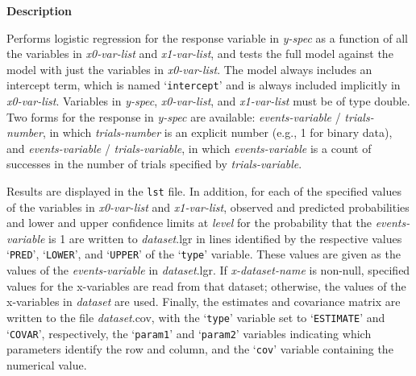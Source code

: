 \documentclass{book}
\newcommand\Texinfocommandstyletextvar[1]{{\normalfont{}\textsl{#1}}}%
\renewcommand{\_}{\Texinfounderscore\discretionary{}{}{}}
\begin{document}
%
%
%

\noindent{}\textbf{Description}

Performs logistic regression for the response variable in
\Texinfocommandstyletextvar{y-spec} as a function of all the variables in
\Texinfocommandstyletextvar{x0-var-list} and \Texinfocommandstyletextvar{x1-var-list},
and tests the full model against the model with just the variables in
\Texinfocommandstyletextvar{x0-var-list}.
The model always includes an intercept term, which is named
`\texttt{\_intercept\_}' and is always included implicitly in
\Texinfocommandstyletextvar{x0-var-list}.
Variables in \Texinfocommandstyletextvar{y-spec}, \Texinfocommandstyletextvar{x0-var-list}, and \Texinfocommandstyletextvar{x1-var-list}
must be of type double.
Two forms for the response in \Texinfocommandstyletextvar{y-spec}
are available: \Texinfocommandstyletextvar{events-variable} / \Texinfocommandstyletextvar{trials-number},
in which \Texinfocommandstyletextvar{trials-number} is an explicit number (e.g., 1 for binary data),
and \Texinfocommandstyletextvar{events-variable} / \Texinfocommandstyletextvar{trials-variable},
in which \Texinfocommandstyletextvar{events-variable}
is a count of successes in the number of trials specified by \Texinfocommandstyletextvar{trials-variable}.

Results are displayed in the \texttt{lst} file.
In addition, for each of the specified values of the variables in
\Texinfocommandstyletextvar{x0-var-list} and \Texinfocommandstyletextvar{x1-var-list},
observed and predicted probabilities
and lower and upper confidence limits at
\Texinfocommandstyletextvar{level} for the probability that the \Texinfocommandstyletextvar{events-variable}
is 1 are written to \Texinfocommandstyletextvar{dataset}.lgr
in lines identified by the respective values
`\texttt{PRED}', `\texttt{LOWER}', and `\texttt{UPPER}' of the `\texttt{\_type\_}' variable.
These values are given as the values of the \Texinfocommandstyletextvar{events-variable} in \Texinfocommandstyletextvar{dataset}.lgr.
If \Texinfocommandstyletextvar{x-dataset-name}
is non-null, specified values for the x-variables
are read from that dataset; otherwise, the values of the x-variables in
\Texinfocommandstyletextvar{dataset} are used.
Finally,
the estimates and covariance matrix are written to the file \Texinfocommandstyletextvar{dataset}.cov,
with the `\texttt{\_type\_}' variable set to `\texttt{ESTIMATE}' and
`\texttt{COVAR}', respectively, the `\texttt{\_param1\_}'
and `\texttt{\_param2\_}' variables indicating which parameters
identify the row and column, and the `\texttt{\_cov\_}' variable containing the numerical value.
\end{document}

